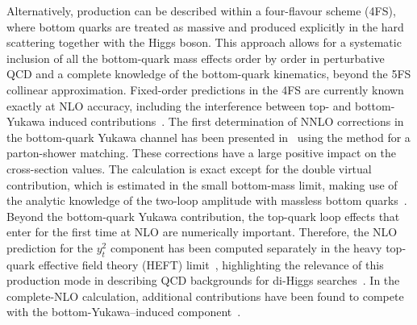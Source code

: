Alternatively, \bbH{} production can be described within a four-flavour scheme (4FS), where bottom quarks are treated as massive and produced explicitly in the hard scattering together with the Higgs boson. This approach allows for a systematic inclusion of all the bottom-quark mass effects order by order in perturbative QCD and a complete knowledge of the bottom-quark kinematics, beyond the 5FS collinear approximation. Fixed-order predictions in the 4FS are currently known exactly at NLO accuracy, including the interference between top- and bottom-Yukawa induced contributions~\cite{Dittmaier:2003ej,Dawson:2003kb,Wiesemann:2014ioa}. The first determination of NNLO corrections in the bottom-quark Yukawa channel has been presented in~ using the \minnlo{} method for a parton-shower matching. These corrections have a large positive impact on the cross-section values. The calculation is exact except for the double virtual contribution, which is estimated in the small bottom-mass limit, making use of the analytic knowledge of the two-loop amplitude with massless bottom quarks~\cite{Badger:2021ega,Badger:2024mir}. Beyond the bottom-quark Yukawa contribution, the top-quark loop effects that enter for the first time at NLO are numerically important. Therefore, the NLO prediction for the $y_t^2$ component has been computed separately in the heavy top-quark effective field theory (HEFT) limit~\cite{Deutschmann:2018avk}, highlighting the relevance of this production mode in describing QCD backgrounds for di-Higgs searches~\cite{Manzoni:2023qaf}. In the complete-NLO calculation, additional contributions have been found to compete with the bottom-Yukawa–induced component~\cite{Pagani:2020rsg}.


